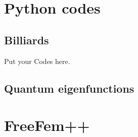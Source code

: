 

\label{App:codes} %


\lstlistoflistings

\section{Python codes}

\subsection{Billiards}

Put your Codes here.



%
%
%
%
%
%
%


\subsection{Quantum eigenfunctions}



\section{FreeFem++}






